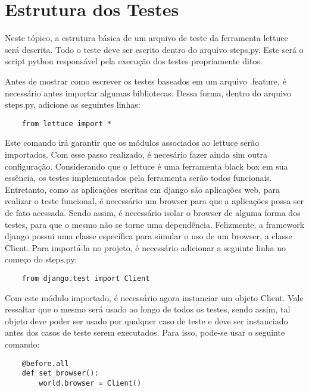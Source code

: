     

\section{Estrutura dos Testes}

    Neste tópico, a estrutura básica de um arquivo de teste da ferramenta
    lettuce será descrita. Todo o teste deve ser escrito dentro do arquivo
    steps.py. Este será o script python responsável pela execução dos testes
    propriamente ditos.

    Antes de mostrar como escrever os testes baseados em um arquivo .feature, é
    necessário antes importar algumas bibliotecas. Dessa forma, dentro do
    arquivo steps.py, adicione as seguintes linhas:

    \begin{verbatim}
    from lettuce import *
    \end{verbatim}

    Este comando irá garantir que os módulos associados ao lettuce serão
    importados. Com esse passo realizado, é necesário fazer ainda sim outra
    configuração. Considerando que o lettuce é uma ferramenta black box em sua
    essência, os testes implementados pela ferramenta serão todos funcionais.
    Entretanto, como as aplicações escritas em django são aplicações web, para
    realizar o teste funcional, é necessário um browser para que a aplicações
    possa ser de fato acessada. Sendo assim, é necessário isolar o browser de
    alguma forma dos testes, para que o mesmo não se torne uma dependência.
    Felizmente, a framework django possui uma classe específica para simular o
    uso de um browser, a classe Client. Para importá-la no projeto, é necessário
    adicionar a seguinte linha no começo do steps.py:

    \begin{verbatim}
    from django.test import Client
    \end{verbatim}

    Com este módulo importado, é necessário agora instanciar um objeto Client.
    Vale ressaltar que o mesmo será usado ao longo de todos os testes, sendo
    assim, tal objeto deve poder ser usado por qualquer caso de teste e deve ser
    instanciado antes dos casos de teste serem executados. Para isso, pode-se
    usar o seguinte comando:

    \begin{verbatim}
    @before.all
    def set_browser():
        world.browser = Client()
    \end{verbatim}

